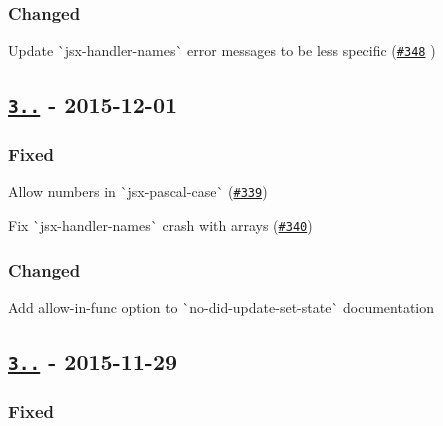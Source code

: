 \subsubsection*{Changed}


\begin{DoxyItemize}
\item Update \`{}jsx-\/handler-\/names\`{} error messages to be less specific (\href{https://github.com/yannickcr/eslint-plugin-react/pull/348}{\tt \#348} )
\end{DoxyItemize}

\subsection*{\href{https://github.com/yannickcr/eslint-plugin-react/compare/v3.11.1...v3.11.2}{\tt 3..} -\/ 2015-\/12-\/01}

\subsubsection*{Fixed}


\begin{DoxyItemize}
\item Allow numbers in \`{}jsx-\/pascal-\/case\`{} (\href{https://github.com/yannickcr/eslint-plugin-react/issues/339}{\tt \#339})
\item Fix \`{}jsx-\/handler-\/names\`{} crash with arrays (\href{https://github.com/yannickcr/eslint-plugin-react/issues/340}{\tt \#340})
\end{DoxyItemize}

\subsubsection*{Changed}


\begin{DoxyItemize}
\item Add {\ttfamily allow-\/in-\/func} option to \`{}no-\/did-\/update-\/set-\/state\`{} documentation
\end{DoxyItemize}

\subsection*{\href{https://github.com/yannickcr/eslint-plugin-react/compare/v3.11.0...v3.11.1}{\tt 3..} -\/ 2015-\/11-\/29}

\subsubsection*{Fixed}


